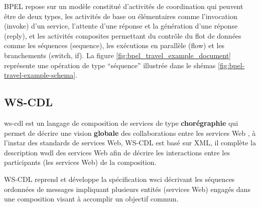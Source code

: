     \textsc{BPEL} repose sur un modèle constitué d'activités de
    coordination qui peuvent être de deux types, les activités de base
    ou élémentaires comme l'invocation (invoke) d'un service,
    l'attente d'une réponse et la génération d'une réponse (reply), et
    les activités composites permettant du contrôle du flot de données
    comme les séquences (sequence), les exécutions en parallèle (flow)
    et les branchements (switch, if). La figure
    \ref{fig:bpel_travel_example_document} représente une opération de
    type ``séquence'' illustrée dans le shémas
    \ref{fig:bpel-travel-example-schema}.

    
    \newpage




    \subsection{WS-CDL}
    \label{WS-CDL}
    \acrshort{ws-cdl} est un langage de composition de services de
    type \textbf{chorégraphie} qui permet de décrire une vision
    \textbf{globale} des collaborations entre les services Web
    \cite{elie2010}, à l'instar des standards de services Web,
    \textsc{WS-CDL} est basé sur \textsc{XML}, il complète la
    description \acrshort{wsdl} des services Web afin de décrire les
    interactions entre les participants (les services Web) de la
    composition.

    \textsc{WS-CDL} reprend et développe la spécification
    \acrshort{wsci} décrivant les séquences ordonnées de messages
    impliquant plusieurs entités (services Web) engagés dans une
    composition visant à accomplir un objectif commun.

